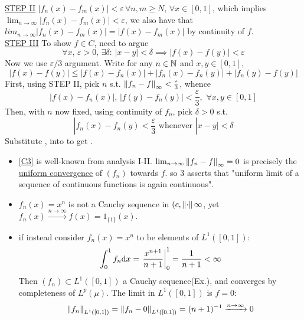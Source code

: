\documentclass{article}
\begin{document}
\underline{STEP II} 
$|f_n(x)-f_m(x)|<\varepsilon\,\forall n,m\geq N,\,\forall x\in[0,1]$, which implies
$\lim_{n\to\infty}|f_n(x)-f_m(x)|<\varepsilon$, we also have that $lim_{n\to\infty}|f_n(x)-f_m(x)|=|f(x)-f_m(x)|$ by continuity of $f$.\\

\underline{STEP III} 
To show $f\in C$, need to argue 
\[
\forall x,\,\varepsilon>0,\,\exists\delta:\,|x-y|<\delta\implies |f(x)-f(y)|<\varepsilon \tag{$C1$}\label{C1}
\]
Now we use $\varepsilon/3$ argument. Write for any $n\in\mathbb{N}$ and $x,y\in[0,1]$,
\[
	|f(x)-f(y)|\leq|f(x)-f_n(x)|+|f_n(x)-f_n(y)|+|f_n(y)-f(y)|\tag{$C2$}\label{C2}
\]
First, using STEP II, pick $n$ s.t. $\left\|{f_n-f}\right\|_\infty<\frac{\varepsilon}{3}$, whence
\[
	|f(x)-f_n(x)|,\,|f(y)-f_n(y)|<\frac{\varepsilon}{3},\,\,\forall x,y\in[0,1]\tag{$C3$}\label{C3}
\]
Then, with $n$ now fixed, using continuity of $f_n$, pick $\delta>0$ s.t.
\[
	|f_n(x)-f_n(y)<\frac{\varepsilon}{3}\text{ whenever } |x-y|<\delta\tag{$C4$}\label{C4}
\]
Substitute , into  to get .


\begin{remark}
	\begin{itemize}
		\item \cref{C3} is well-known from analysis I-II. $\lim_{n\to\infty}\left\|{f_n-f}\right\|_\infty=0$ is precisely the \underline{uniform convergence} of $(f_n)$ towards $f$. so 3 asserts that "uniform limit of a sequence of continuous functions is again continuous".
		\item $f_n(x)=x^n$ is not a Cauchy sequence in $(c,\left\|{\cdot}\right\|\infty$, yet $f_n(x)\xrightarrow{n\to\infty} f(x)=1_{\{1\}}(x)$.
		\item if instead consider $f_n(x)=x^n$ to be elements of $L^1([0,1])$:
		      $$\int_0^1f_n{\rm d}x=\left.\frac{x^{n+1}}{n+1}\right|^1_0=\frac{1}{n+1}<\infty$$
		      Then $(f_n)\subset L^1([0,1])$ a Cauchy sequence(Ex.), and converges by  completeness of $L^p(\mu)$. The limit in $L^1([0,1])$ is $f=0$:
		      $$\left\|{f_n}\right\|_{L^1([0,1])}=\left\|{f_n-0}\right\|_{L^1([0,1])}=(n+1)^{-1}\xrightarrow{n\to\infty}0$$
	\end{itemize}

\end{remark}
\end{document}

